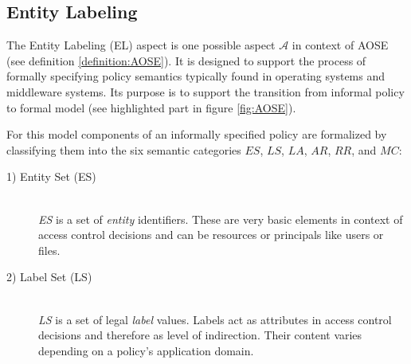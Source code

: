 \documentclass[twoside, openright, 12pt]{book}
\begin{document}
\subsection{Entity Labeling}
\label{EL}
The Entity Labeling (EL) aspect is one possible aspect $\mathcal{A}$ in context of AOSE (see definition \ref{definition:AOSE}).
It is designed to support the process of formally specifying policy semantics typically found in operating systems and middleware systems.
Its purpose is to support the transition from informal policy to formal model (see highlighted part in figure \ref{fig:AOSE}).

For this model components of an informally specified policy are formalized by classifying them into the six semantic categories $ES$, $LS$, $LA$, $AR$, $RR$, and $MC$:

\begin{description}
\item[1) Entity Set (ES)]\hfill \\
\textit{ES} is a set of \textit{entity} identifiers.
These are very basic elements in context of access control decisions and can be resources or principals like users or files.


\item[2) Label Set (LS)]\hfill \\
\textit{LS} is a set of legal \textit{label} values.
Labels act as attributes in access control decisions and therefore as level of indirection.
Their content varies depending on a policy's application domain.



\end{description}
\end{document}
